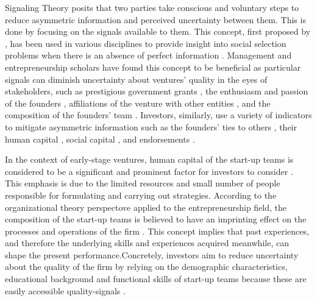 \documentclass[12pt]{article}
\begin{document}
Signaling Theory posits that two parties take conscious and voluntary steps to reduce asymmetric information and perceived uncertainty between them. This is done by focusing on the signals available to them. This concept, first proposed by \citet{spence1974market}, has been used in various disciplines to provide insight into social selection problems when there is an absence of perfect information \citep{connelly2011signaling, colombo2021use}. Management and entrepreneurship scholars have found this concept to be beneficial as particular signals can diminish uncertainty about ventures' quality in the eyes of stakeholders, such as prestigious government grants \citep{islam2018signaling}, the enthusiasm and passion of the founders \citep{chen2009entrepreneur}, affiliations of the venture with other entities \citep{plummer2016better}, and the composition of the founders' team \citep{ko2018signaling}. Investors, similarly, use a variety of indicators to mitigate asymmetric information such as the founders' ties to others \citep{shane2002network}, their human capital \citep{beckman2007early}, social capital \citep{shane2002organizational}, and endorsements \citep{courtney2017resolving, janney2006moderating, plummer2016better}.

In the context of early-stage ventures, human capital of the start-up teams is considered to be a significant and prominent factor for investors to consider \citep{beckman2007early, ko2018signaling, matusik2008values}. This emphasis is due to the limited resources and small number of people responsible for formulating and carrying out strategies. According to the organizational theory perspectove applied to the entrepreneurship field, the composition of the start-up teams is believed to have an imprinting effect on the processes and operations of the firm \citep{packalen2007complementing}. This concept implies that past experiences, and therefore the underlying skills and experiences acquired meanwhile, can shape the present performance.Concretely, investors aim to reduce uncertainty about the quality of the firm by relying on the demographic characteristics, educational background and functional skills of start-up teams because these are easily accessible quality-signals \citep{colombo2005founders, beckman2007early, eddleston2016you, plummer2016better}.
\end{document}
